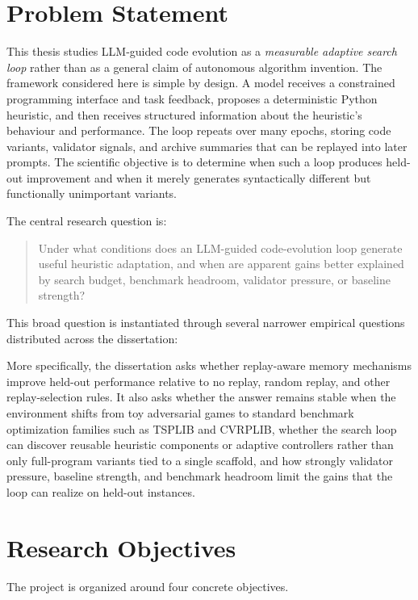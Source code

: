 \section{Problem Statement}
\label{sec:intro-problem}

This thesis studies LLM-guided code evolution as a \emph{measurable adaptive search loop}
rather than as a general claim of autonomous algorithm invention. The framework considered here is
simple by design. A model receives a constrained programming interface and task feedback, proposes
a deterministic Python heuristic, and then receives structured information about the heuristic's
behaviour and performance. The loop repeats over many epochs, storing code variants, validator
signals, and archive summaries that can be replayed into later prompts. The scientific objective
is to determine when such a loop produces held-out improvement and when it merely generates
syntactically different but functionally unimportant variants.

The central research question is:

\begin{quote}
Under what conditions does an LLM-guided code-evolution loop generate useful heuristic adaptation,
and when are apparent gains better explained by search budget, benchmark headroom, validator
pressure, or baseline strength?
\end{quote}

This broad question is instantiated through several narrower empirical questions distributed
across the dissertation:

More specifically, the dissertation asks whether replay-aware memory mechanisms improve held-out
performance relative to no replay, random replay, and other replay-selection rules. It also asks
whether the answer remains stable when the environment shifts from toy adversarial games to
standard benchmark optimization families such as TSPLIB and CVRPLIB, whether the search loop can
discover reusable heuristic components or adaptive controllers rather than only full-program
variants tied to a single scaffold, and how strongly validator pressure, baseline strength, and
benchmark headroom limit the gains that the loop can realize on held-out instances.

\section{Research Objectives}
\label{sec:intro-objectives}

The project is organized around four concrete objectives.

